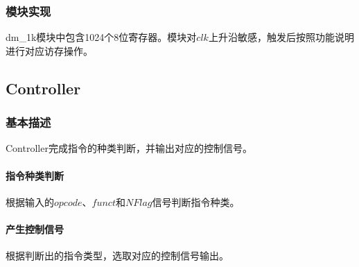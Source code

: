 \documentclass[main.tex]{subfiles}
\begin{document}
\subsubsection{模块实现}
dm\_1k模块中包含1024个8位寄存器。模块对$clk$上升沿敏感，触发后按照功能说明进行对应访存操作。

\clearpage \subsection{Controller}
\subsubsection{基本描述}
Controller完成指令的种类判断，并输出对应的控制信号。
\paragraph{指令种类判断}
根据输入的$opcode$、$funct$和$NFlag$信号判断指令种类。
\paragraph{产生控制信号}
根据判断出的指令类型，选取对应的控制信号输出。
\end{document}
